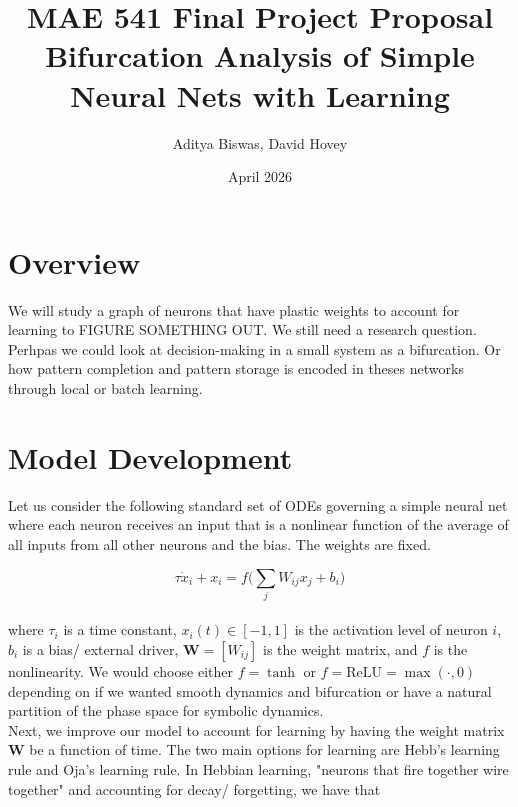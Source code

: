 \documentclass{article}
\title{MAE 541 Final Project Proposal \\[0.5em] \Large Bifurcation Analysis of Simple Neural Nets with Learning}
\author{Aditya Biswas, David Hovey}
\date{April 2026}
\begin{document}
\maketitle


\maketitle
\pagebreak

\section*{Overview}
We will study a graph of neurons that have plastic weights to account for learning to FIGURE SOMETHING OUT. We still need a research question. Perhpas we could look at decision-making in a small system as a bifurcation. Or how pattern completion and pattern storage is encoded in theses networks through local or batch learning.

\section*{Model Development}
Let us consider the following standard set of ODEs governing a simple neural net where each neuron receives an input that is a nonlinear function of the average of all inputs from all other neurons and the bias. The weights are fixed.


\begin{equation}
    \tau \dot{x}_i + x_i = f\bigg(\sum_j W_{ij} x_j + b_i\bigg)
\end{equation}
\\
where $\tau_i$ is a time constant, $x_i(t)\in[-1,1]$ is the activation level of neuron $i$, $b_i$ is a bias/ external driver, $\mathbf{W} = [W_{ij}]$ is the weight matrix, and $f$ is the nonlinearity. We would choose either $f=\tanh$ or $f=\text{ReLU}=\max(\cdot,0)$ depending on if we wanted smooth dynamics and bifurcation or have a natural partition of the phase space for symbolic dynamics.
\vspace{0.25cm}
\\
\hspace{0.5cm} Next, we improve our model to account for learning by having the weight matrix $\mathbf{W}$ be a function of time. The two main options for learning are Hebb's learning rule and Oja's learning rule. In Hebbian learning, "neurons that fire together wire together" and accounting for decay/ forgetting, we have that
\end{document}
